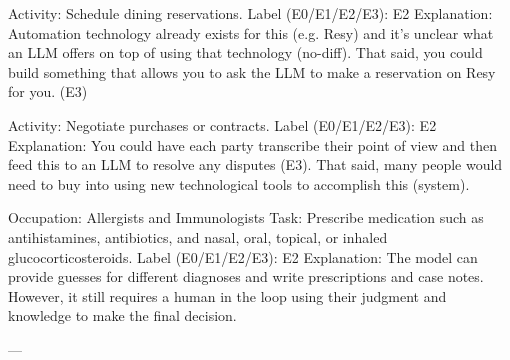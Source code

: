 Activity: Schedule dining reservations.
Label (E0/E1/E2/E3): E2
Explanation: Automation technology already exists for this (e.g. Resy) and it’s unclear what an LLM offers on top of using that technology (no-diff). That said, you could build something that allows you to ask the LLM to make a reservation on Resy for you. (E3)

Activity: Negotiate purchases or contracts.
Label (E0/E1/E2/E3): E2
Explanation: You could have each party transcribe their point of view and then feed this to an LLM to resolve any disputes (E3). That said, many people would need to buy into using new technological tools to accomplish this (system).

Occupation: Allergists and Immunologists
Task: Prescribe medication such as antihistamines, antibiotics, and nasal, oral, topical, or inhaled glucocorticosteroids.
Label (E0/E1/E2/E3): E2
Explanation: The model can provide guesses for different diagnoses and write prescriptions and case notes. However, it still requires a human in the loop using their judgment and knowledge to make the final decision.

—
